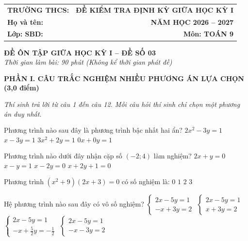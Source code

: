 \documentclass[12pt,a4paper]{article}
\begin{document}
\noindent
\begin{tabularx}{\linewidth}{X r}
\textbf{TRƯỜNG THCS: \dotfill} & \textbf{ĐỀ KIỂM TRA ĐỊNH KỲ GIỮA HỌC KỲ I} \\
\textbf{Họ và tên: \dotfill} & \textbf{NĂM HỌC 2026 -- 2027} \\
\textbf{Lớp: \dotfill \quad SBD: \dotfill} & \textbf{Môn: TOÁN 9} \\
\hline
\end{tabularx}
\vspace{2mm}

\begin{center}
  \textbf{\large ĐỀ ÔN TẬP GIỮA HỌC KỲ I -- ĐỀ SỐ 03}\\
  \textit{Thời gian làm bài: 90 phút (Không kể thời gian phát đề)}
\end{center}
\vspace{1mm}

\noindent\textbf{\large PHẦN I. CÂU TRẮC NGHIỆM NHIỀU PHƯƠNG ÁN LỰA CHỌN (3,0 điểm)}

\textit{Thí sinh trả lời từ câu 1 đến câu 12. Mỗi câu hỏi thí sinh chỉ chọn một phương án duy nhất.}

\vspace{1mm}
\begin{ex}
Phương trình nào sau đây là phương trình bậc nhất hai ẩn?
\choice
{$2x^2 - 3y = 1$}
{\True $x - 3y = 1$}
{$3x^2 + 2y = 1$}
{$0x + 0y = 1$}
\end{ex}

\begin{ex}
Phương trình nào dưới đây nhận cặp số $(-2; 4)$ làm nghiệm?
\choice
{\True $2x + y = 0$}
{$x - y = 1$}
{$x - 2y = 0$}
{$x + 2y + 1 = 0$}
\end{ex}

\begin{ex}
Phương trình $(x^2 + 9)(2x + 3) = 0$ có số nghiệm là:
\choice
{$0$}
{\True $1$}
{$2$}
{$3$}
\end{ex}

\begin{ex}
Hệ phương trình nào sau đây có vô số nghiệm?
\choice
{$\begin{cases} 2x - 5y = 1 \\ -x + 3y = 2 \end{cases}$}
{$\begin{cases} 2x - 5y = 1 \\ x + 3y = 2 \end{cases}$}
{\True $\begin{cases} 2x - 5y = 1 \\ -x + \frac{5}{2}y = -\frac{1}{2} \end{cases}$}
{$\begin{cases} 2x - 5y = 1 \\ -x - 3y = 2 \end{cases}$}
\end{ex}
\end{document}
